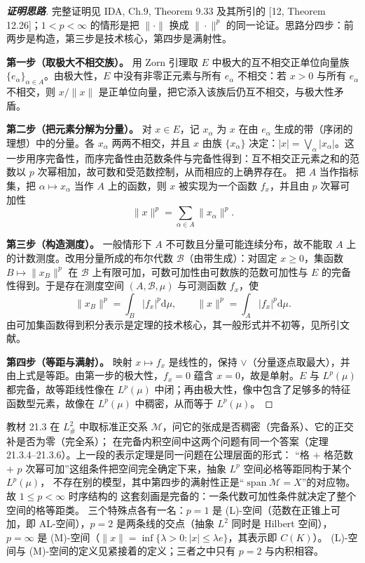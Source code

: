\documentclass[oneside]{book}
\theoremstyle{definition}
\newcommand{\dd}{\mathrm{d}}
\DeclareMathOperator{\spann}{span}
\theoremstyle{definition}
\begin{document}
	\begin{proof}[\bfseries{证明思路}]
		完整证明见 IDA, Ch.9, Theorem 9.33 及其所引的 [12, Theorem 12.26]；$1<p<\infty$ 的情形是把 $\|\cdot\|$ 换成 $\|\cdot\|^{p}$ 的同一论证。思路分四步：前两步是构造，第三步是技术核心，第四步是满射性。
		
		\textbf{第一步（取极大不相交族）。} 用 Zorn 引理取 $E$ 中极大的互不相交正单位向量族 $\{e_{\alpha}\}_{\alpha\in A}$。由极大性，$E$ 中没有非零正元素与所有 $e_{\alpha}$ 不相交：若 $x>0$ 与所有 $e_{\alpha}$ 不相交，则 $x/\|x\|$ 是正单位向量，把它添入该族后仍互不相交，与极大性矛盾。
		
		\textbf{第二步（把元素分解为分量）。} 对 $x\in E$，记 $x_{\alpha}$ 为 $x$ 在由 $e_{\alpha}$ 生成的带（序闭的理想）中的分量。各 $x_{\alpha}$ 两两不相交，并且 $x$ 由族 $\{x_{\alpha}\}$ 决定：$|x|=\bigvee_{\alpha}|x_{\alpha}|$。这一步用序完备性，而序完备性由范数条件与完备性得到：互不相交正元素之和的范数以 $p$ 次幂相加，故可数和受范数控制，从而相应的上确界存在。
		把 $A$ 当作指标集，把 $\alpha\mapsto x_{\alpha}$ 当作 $A$ 上的函数，则 $x$ 被实现为一个函数 $f_{x}$，并且由 $p$ 次幂可加性
		\[
		\|x\|^{p}=\sum_{\alpha\in A}\|x_{\alpha}\|^{p}.
		\]
		
		\textbf{第三步（构造测度）。} 一般情形下 $A$ 不可数且分量可能连续分布，故不能取 $A$ 上的计数测度。改用分量所成的布尔代数 $\mathcal{B}$（由带生成）：对固定 $x\geqslant0$，集函数 $B\mapsto\|x_{B}\|^{p}$ 在 $\mathcal{B}$ 上有限可加，可数可加性由可数族的范数可加性与 $E$ 的完备性得到。于是存在测度空间 $(A,\mathcal{B},\mu)$ 与可测函数 $f_{x}$，使
		\[
		\|x_{B}\|^{p}=\int_{B}|f_{x}|^{p}\dd\mu,\qquad \|x\|^{p}=\int_{A}|f_{x}|^{p}\dd\mu .
		\]
		由可加集函数得到积分表示是定理的技术核心，其一般形式并不初等，见所引文献。
		
		\textbf{第四步（等距与满射）。} 映射 $x\mapsto f_{x}$ 是线性的，保持 $\vee$（分量逐点取最大），并由上式是等距。由第一步的极大性，$f_{x}=0$ 蕴含 $x=0$，故是单射。$E$ 与 $L^{p}(\mu)$ 都完备，故等距线性像在 $L^{p}(\mu)$ 中闭；再由极大性，像中包含了足够多的特征函数型元素，故像在 $L^{p}(\mu)$ 中稠密，从而等于 $L^{p}(\mu)$。
	\end{proof}
	
	\begin{link}[教材 21.3 完备系与完全系的抽象版本]
		教材 21.3 在 $L^{2}_{\#}$ 中取标准正交系 $\mathcal{M}$，问它的张成是否稠密（完备系）、它的正交补是否为零（完全系）；
		在完备内积空间中这两个问题有同一个答案（定理 21.3.4--21.3.6）。上一段的表示定理是同一问题在公理层面的形式：
		“格 $+$ 格范数 $+$ $p$ 次幂可加”这组条件把空间完全确定下来，抽象 $L^{p}$ 空间必格等距同构于某个 $L^{p}(\mu)$，
		不存在别的模型，其中第四步的满射性正是“$\overline{\spann\mathcal{M}}=X$”的对应物。故 $1\leqslant p<\infty$ 时序结构的
		这套刻画是完备的：一条代数可加性条件就决定了整个空间的格等距类。
		三个特殊点各有一名：$p=1$ 是 (L)-空间（范数在正锥上可加，即 AL-空间），$p=2$ 是两条线的交点（抽象 $L^{2}$ 同时是
		Hilbert 空间），$p=\infty$ 是 (M)-空间（$\|x\|=\inf\{\lambda>0:|x|\leqslant\lambda e\}$，其表示即 $C(K)$）。
		(L)-空间与 (M)-空间的定义见紧接着的定义；三者之中只有 $p=2$ 与内积相容。
	\end{link}
	
\end{document}
